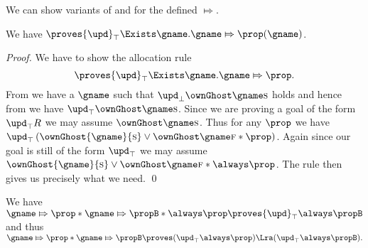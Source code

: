 We can show variants of  and  for the defined $\Mapsto$.
\begin{lem}
  \label{lem:counterexample-invariants-saved-prop-alloc}
We have
  \(\proves {\upd}_\top \Exists \gname. \gname \Mapsto \prop(\gname)\).
\end{lem}
\begin{proof}
  We have to show the allocation rule \[\proves {\upd}_\top \Exists \gname. \gname \Mapsto \prop.\]
    From  we have a $\gname$ such that ${\upd}_\bot \ownGhost \gname \starttoken$ holds and hence from  we have ${\upd}_\top\ownGhost\gname \starttoken$.
    Since we are proving a goal of the form ${\upd}_\top R$ we may assume $\ownGhost \gname \starttoken$.
    Thus for any $\prop$ we have ${\upd}_\top\left(\ownGhost{\gname}{\starttoken} \lor \ownGhost \gname \finishtoken * \prop\right)$.
    Again since our goal is still of the form ${\upd}_\top$ we may assume $\ownGhost{\gname}{\starttoken} \lor \ownGhost \gname \finishtoken * \always \prop$.
    The rule  then gives us precisely what we need.
 \qed \end{proof}

%
\begin{lem}
\label{lem:counterexample-invariants-saved-prop-agree}
We have
  \(
  \gname \Mapsto \prop * \gname \Mapsto \propB * \always \prop \proves {\upd}_\top \always \propB
  \)
and thus
  \(
  \gname \Mapsto \prop * \gname \Mapsto \propB \proves ({\upd}_\top \always \prop) \Lra ({\upd}_\top \always \propB).
  \)
\end{lem}

